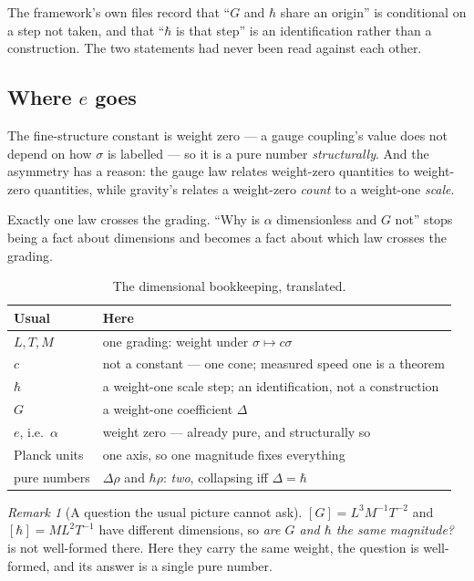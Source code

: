 \documentclass[11pt,a4paper]{article}
\theoremstyle{definition}
\theoremstyle{remark}
\newtheorem{remark}[theorem]{Remark}
\newcommand{\sg}{\sigma}
\begin{document}
The framework's own files record that ``$G$ and $\hbar$ share an origin'' is
conditional on a step not taken, and that ``$\hbar$ is that step'' is an
identification rather than a construction. The two statements had never been read
against each other.

\subsection{\texorpdfstring{Where $e$ goes}{Where e goes}}

The fine-structure constant is weight zero --- a gauge coupling's value does not
depend on how $\sg$ is labelled --- so it is a pure number \emph{structurally}. And
the asymmetry has a reason: the gauge law relates weight-zero quantities to
weight-zero quantities, while gravity's relates a weight-zero \emph{count} to a
weight-one \emph{scale}.

\begin{claimbox}
Exactly one law crosses the grading. ``Why is $\alpha$ dimensionless and $G$ not''
stops being a fact about dimensions and becomes a fact about which law crosses the
grading.
\end{claimbox}

\begin{table}[t]
\centering
\begin{tabular}{@{}ll@{}}
\toprule
\textbf{Usual} & \textbf{Here} \\
\midrule
$L,T,M$ & one grading: weight under $\sg\mapsto c\sg$ \\
$c$ & not a constant --- one cone; measured speed one is a theorem \\
$\hbar$ & a weight-one scale step; an identification, not a construction \\
$G$ & a weight-one coefficient $\Delta$ \\
$e$, i.e.\ $\alpha$ & weight zero --- already pure, and structurally so \\
Planck units & one axis, so one magnitude fixes everything \\
pure numbers & $\Delta\rho$ and $\hbar\rho$: \emph{two}, collapsing iff
$\Delta=\hbar$ \\
\bottomrule
\end{tabular}
\caption{The dimensional bookkeeping, translated.}
\end{table}

\begin{remark}[A question the usual picture cannot ask]
$[G]=L^{3}M^{-1}T^{-2}$ and $[\hbar]=ML^{2}T^{-1}$ have different dimensions, so
\emph{are $G$ and $\hbar$ the same magnitude?} is not well-formed there. Here they
carry the same weight, the question is well-formed, and its answer is a single pure
number.
\end{remark}
\end{document}
